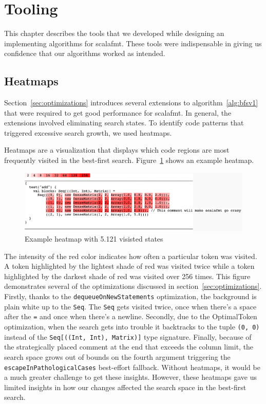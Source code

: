 \section{Tooling}\label{sec:tooling}
This chapter describes the tools that we developed while designing an implementing algorithms for scalafmt.
These tools were indispensable in giving us confidence that our algorithms worked as intended.

\subsection{Heatmaps}
Section~\ref{sec:optimizations} introduces several extensions to algorithm~\ref{alg:bfsv1} that were required to get good performance for scalafmt.
In general, the extensions involved eliminating search states.
To identify code patterns that triggered excessive search growth, we used heatmaps.

Heatmaps are a visualization that displays which code regions are most frequently visited in the best-first search.
Figure~\ref{fig:heatmap} shows an example heatmap.
\begin{figure}
  \centering
  \includegraphics[width=\textwidth]{img/heatmap.png}
  \caption{Example heatmap with 5.121 visisted states}
  \label{fig:heatmap}
\end{figure}
The intensity of the red color indicates how often a particular token was visited.
A token highlighted by the lightest shade of red was visited twice while a token highlighted by the darkest shade of red was visited over 256 times.
This figure demonstrates several of the optimizations discussed in section~\ref{sec:optimizations}.
Firstly, thanks to the \texttt{dequeueOnNewStatements} optimization, the background is plain white up to the \texttt{Seq}.
The \texttt{Seq} gets visited twice, once when there's a space after the \texttt{=} and once when there's a newline.
Secondly, due to the OptimalToken optimization, when the search gets into trouble it backtracks to the tuple \texttt{(0, 0)} instead of the \texttt{Seq[((Int, Int), Matrix)]} type signature.
Finally, because of the strategically placed comment at the end that exceeds the column limit, the search space grows out of bounds on the fourth argument triggering the \texttt{escapeInPathologicalCases} best-effort fallback.
Without heatmaps, it would be a much greater challenge to get these insights.
However, these heatmaps gave us limited insights in how our changes affected the search space in the best-first search.

